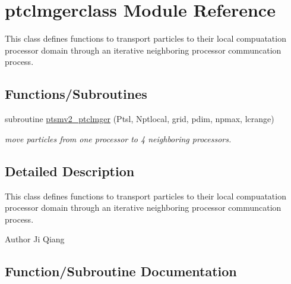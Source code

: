 \hypertarget{namespaceptclmgerclass}{}\section{ptclmgerclass Module Reference}
\label{namespaceptclmgerclass}


This class defines functions to transport particles to their local compuatation processor domain through an iterative neighboring processor communcation process.  


\subsection*{Functions/\+Subroutines}
\begin{DoxyCompactItemize}
\item 
subroutine \mbox{\hyperlink{namespaceptclmgerclass_a15bfd87febad22b6f820896f8720a3d7}{ptsmv2\+\_\+ptclmger}} (Ptsl, Nptlocal, grid, pdim, npmax, lcrange)
\begin{DoxyCompactList}\small\item\em move particles from one processor to 4 neighboring processors. \end{DoxyCompactList}\end{DoxyCompactItemize}


\subsection{Detailed Description}
This class defines functions to transport particles to their local compuatation processor domain through an iterative neighboring processor communcation process. 

\begin{DoxyAuthor}{Author}
Ji Qiang 
\end{DoxyAuthor}


\subsection{Function/\+Subroutine Documentation}
\mbox{\label{namespaceptclmgerclass_a15bfd87febad22b6f820896f8720a3d7}} 
